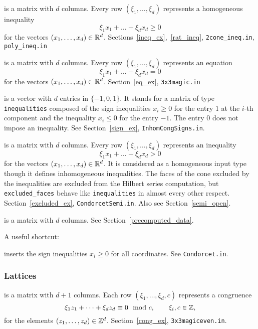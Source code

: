 \begin{itemize}
	\itemtt[inequalities] is a matrix with $d$ columns. Every row $(\xi_1,\dots,\xi_d)$ represents a homogeneous inequality
	$$
	\xi_1x_1+\dots+\xi_dx_d\ge 0
	$$
	for the vectors $(x_1,\dots,x_d)\in{\mathbb R}^d$. Sections~\ref{ineq_ex},~\ref{rat_ineq}, \verb|2cone_ineq.in|, \verb|poly_ineq.in|
	
	\itemtt[equations] is a matrix with $d$ columns. Every row $(\xi_1,\dots,\xi_d)$ represents an equation
	$$
	\xi_1x_1+\dots+\xi_dx_d= 0
	$$
	for the vectors $(x_1,\dots,x_d)\in{\mathbb R}^d$. Section~\ref{eq_ex}, \verb|3x3magic.in|
	
	\itemtt[signs] is a vector with $d$ entries in $\{-1,0,1\}$.
	It stands for a matrix of type \verb|inequalities| composed of the sign inequalities $x_i\ge 0$ for the entry $1$ at the $i$-th component and the inequality $x_i\le 0$ for the entry $-1$. The entry $0$ does not impose an inequality. See Section~\ref{sign_ex}, \verb|InhomCongSigns.in|.
	
	 is a matrix with $d$ columns. Every row $(\xi_1,\dots,\xi_d)$ represents an inequality
	$$
	\xi_1x_1+\dots+\xi_dx_d> 0
	$$
	for the vectors $(x_1,\dots,x_d)\in{\mathbb R}^d$. It is considered as a homogeneous input type though it defines inhomogeneous inequalities. The faces of the cone excluded by the inequalities are excluded from the Hilbert series computation, but \verb|excluded_faces| behave like \verb|inequalities| in almost every other respect.
	Section~\ref{excluded_ex}, \verb|CondorcetSemi.in|. Also see Section~\ref{semi_open}.
	
	 is a matrix with $d$ columns. See Section~\ref{precomputed_data}.
\end{itemize}
A useful shortcut:
\begin{itemize}	
	\itemtt[nonnegative] inserts the sign inequalities $x_i\ge 0$ for all coordinates. See \verb|Condorcet.in|.
\end{itemize}

\subsubsection{Lattices}

\begin{itemize}
	
	\itemtt[congruences] is a matrix with $d+1$ columns. Each row $(\xi_1,\dots,\xi_d,c)$ represents a congruence
	$$
	\xi_1z_1+\dots+\xi_dz_d\equiv 0 \mod c, \qquad \xi_i,c\in{\mathbb Z},
	$$
	for the elements $(z_1,\dots,z_d)\in{\mathbb Z}^d$. Section~\ref{cong_ex}, \verb|3x3magiceven.in|.
\end{itemize}

